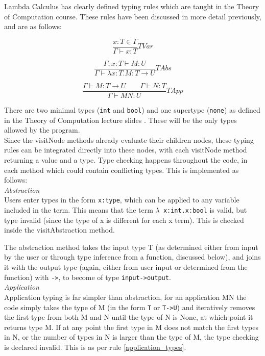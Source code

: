 \documentclass[a4paper,12pt]{report}
\begin{document}
Lambda Calculus has clearly defined typing rules which are taught in the Theory of Computation course. These rules have been discussed in more detail previously, and are as follows:

\begin{equation}
\frac{x:T\in \Gamma}{\Gamma \vdash x:T}TVar
\label{variable_type}
\end{equation}

\begin{equation}
\frac{\Gamma ,x:T\vdash M:U}{\Gamma \vdash \lambda x:T.M:T \to U}TAbs
\end{equation}

\begin{equation}
\frac{\Gamma \vdash M:T \to U \qquad \Gamma \vdash N:T}{\Gamma \vdash MN:U}TApp
\label{application_types}
\end{equation}

There are two minimal types (\texttt{int} and \texttt{bool}) and one supertype (\texttt{none}) as defined in the Theory of Computation lecture slides \cite{Gay2019}. These will be the only types allowed by the program.\\

Since the visitNode methods already evaluate their children nodes, these typing rules can be integrated directly into these nodes, with each visitNode method returning a value and a type. Type checking happens throughout the code, in each method which could contain conflicting types. This is implemented as follows:\\

\textit{Abstraction}\\
Users enter types in the form \texttt{x:type}, which can be applied to any variable included in the term. This means that the term \texttt{$\lambda$ x:int.x:bool} is valid, but type invalid (since the type of x is different for each x term). This is checked inside the visitAbstraction method.

The abstraction method takes the input type T (as determined either from input by the user or through type inference from a function, discussed below), and joins it with the output type (again, either from user input or determined from the function) with \texttt{->}, to become of type \texttt{input->output}.\\

\textit{Application}\\
Application typing is far simpler than abstraction, for an application MN the code simply takes the type of M (in the form \texttt{T} or \texttt{T->U}) and iteratively removes the first type from both M and N until the type of N is None, at which point it returns type M. If at any point the first type in M does not match the first types in N, or the number of types in N is larger than the type of M, the type checking is declared invalid. This is as per rule \ref{application_types}.\\
\end{document}
